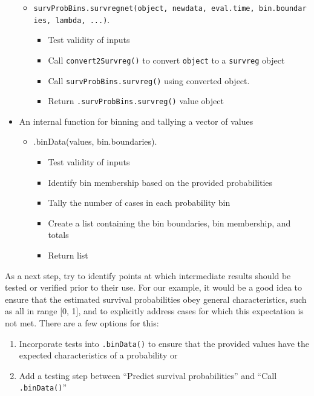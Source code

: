 \documentclass[
]{book}
\providecommand{\tightlist}{%
  \setlength{\itemsep}{0pt}\setlength{\parskip}{0pt}}
\begin{document}
\begin{itemize}
  \begin{itemize}
  \tightlist
  \item
    \texttt{survProbBins.survregnet(object,\ newdata,\ eval.time,\ bin.boundaries,\ lambda,\ ...)}.

    \begin{itemize}
    \tightlist
    \item
      Test validity of inputs
    \item
      Call \texttt{convert2Survreg()} to convert \texttt{object} to a \texttt{survreg} object
    \item
      Call \texttt{survProbBins.survreg()} using converted object.
    \item
      Return \texttt{.survProbBins.survreg()} value object
    \end{itemize}
  \end{itemize}
\item
  An internal function for binning and tallying a vector of values

  \begin{itemize}
  \tightlist
  \item
    .binData(values, bin.boundaries).

    \begin{itemize}
    \tightlist
    \item
      Test validity of inputs
    \item
      Identify bin membership based on the provided probabilities
    \item
      Tally the number of cases in each probability bin
    \item
      Create a list containing the bin boundaries, bin membership, and totals
    \item
      Return list
    \end{itemize}
  \end{itemize}
\end{itemize}

As a next step, try to identify points at which intermediate results should be tested or verified prior to their use. For our example, it would be a good idea to ensure that the estimated survival probabilities obey general characteristics, such as all in range {[}0, 1{]}, and to explicitly address cases for which this expectation is not met. There are a few options for this:

\begin{enumerate}
\def\labelenumi{\arabic{enumi}.}
\tightlist
\item
  Incorporate tests into \texttt{.binData()} to ensure that the provided values have the expected characteristics of a probability or
\item
  Add a testing step between ``Predict survival probabilities'' and ``Call \texttt{.binData()}''
\end{enumerate}
\end{document}
